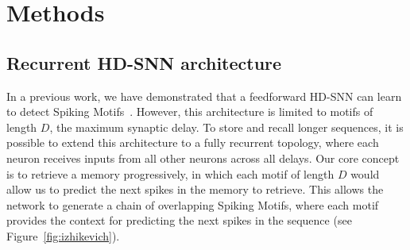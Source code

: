 \documentclass{scrartcl}
\newcommand{\citep}[1]{\parencite{#1}}
\begin{document}
\section{Methods}
\label{sec:methods}
\subsection{Recurrent HD-SNN architecture} %

In a previous work, we have demonstrated that a feedforward HD-SNN can learn to detect Spiking Motifs~\citep{Perrinet2023}. However, this architecture is limited to motifs of length $D$, the maximum synaptic delay. To store and recall longer sequences, it is possible to extend this architecture to a fully recurrent topology, where each neuron receives inputs from all other neurons across all delays. Our core concept is to retrieve a memory progressively, in which each motif of length $D$ would allow us to predict the next spikes in the memory to retrieve. This allows the network to generate a chain of overlapping Spiking Motifs, where each motif provides the context for predicting the next spikes in the sequence (see Figure~\ref{fig:izhikevich}).
\end{document}
